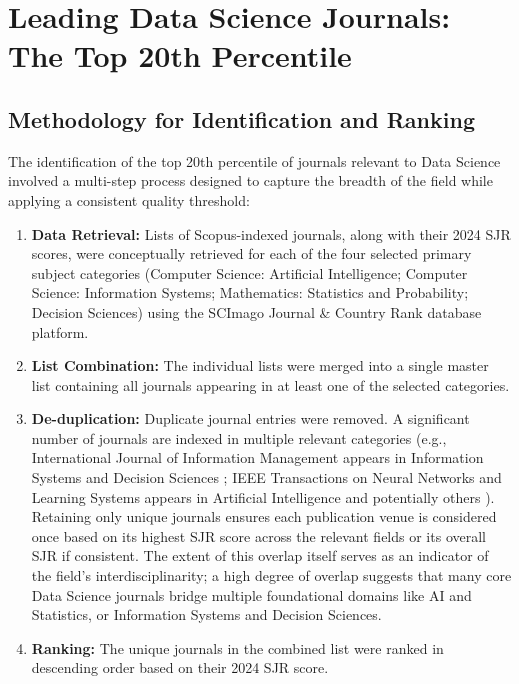 \documentclass[../main.tex]{subfiles}
\begin{document}
\section{Leading Data Science Journals: The Top 20th Percentile}

\subsection{Methodology for Identification and Ranking}

\vspace{0.2cm}
\noindent
The identification of the top 20th percentile of journals relevant to Data Science involved a multi-step process designed to capture the breadth of the field while applying a consistent quality threshold:

\begin{enumerate}
    \item \textbf{Data Retrieval:} Lists of Scopus-indexed journals, along with their 2024 SJR scores, were conceptually retrieved for each of the four selected primary subject categories (Computer Science: Artificial Intelligence; Computer Science: Information Systems; Mathematics: Statistics and Probability; Decision Sciences) using the SCImago Journal \& Country Rank database platform.
    
    \item \textbf{List Combination:} The individual lists were merged into a single master list containing all journals appearing in at least one of the selected categories.
    
    \item \textbf{De-duplication:} Duplicate journal entries were removed. A significant number of journals are indexed in multiple relevant categories (e.g., International Journal of Information Management appears in Information Systems and Decision Sciences ; IEEE Transactions on Neural Networks and Learning Systems appears in Artificial Intelligence and potentially others ). Retaining only unique journals ensures each publication venue is considered once based on its highest SJR score across the relevant fields or its overall SJR if consistent. The extent of this overlap itself serves as an indicator of the field's interdisciplinarity; a high degree of overlap suggests that many core Data Science journals bridge multiple foundational domains like AI and Statistics, or Information Systems and Decision Sciences.
    
    \item \textbf{Ranking:} The unique journals in the combined list were ranked in descending order based on their 2024 SJR score.
    

\end{enumerate}
\end{document}
